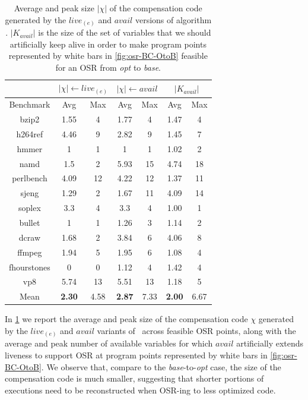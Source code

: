\begin{table}[!ht]
\begin{center}
\begin{small}
\begin{tabular}{ |c|c|c|c|c|c|c| }
\cline{2-7}
\multicolumn{1}{l|}{} & \multicolumn{2}{c|}{$|\chi|\leftarrow live_{(e)}$} & \multicolumn{2}{c|}{$|\chi|\leftarrow avail$} & \multicolumn{2}{c|}{$|K_{avail}|$} \\
\hline
Benchmark & Avg & Max & Avg & Max & Avg & Max \\
\hline
\hline
bzip2 & 1.55 & 4 & 1.77 & 4 & 1.47 & 4 \\
\hline
h264ref & 4.46 & 9 & 2.82 & 9 & 1.45 & 7 \\
\hline
hmmer & 1 & 1 & 1 & 1 & 1.02 & 2 \\
\hline
namd & 1.5 & 2 & 5.93 & 15 & 4.74 & 18\\
\hline
perlbench & 4.09 & 12 & 4.22 & 12 & 1.37 & 11 \\
\hline
sjeng & 1.29 & 2 & 1.67 & 11 & 4.09 & 14 \\
\hline
soplex & 3.3 & 4 & 3.3 & 4 & 1.00 & 1 \\
\hline
bullet & 1 & 1 & 1.26 & 3 & 1.14 & 2 \\
\hline
dcraw & 1.68 & 2 & 3.84 & 6 & 4.06 & 8 \\
\hline
ffmpeg & 1.94 & 5 & 1.95 & 6 & 1.08 & 4 \\
\hline
fhourstones & 0 & 0 & 1.12 & 4 & 1.42 & 4 \\
\hline
vp8 & 5.74 & 13 & 5.51 & 13 & 1.18 & 5 \\
\hline
\hline
Mean & {\bf 2.30} & 4.58 & {\bf 2.87} & 7.33 & {\bf 2.00} & 6.67 \\
\hline
\end{tabular}
\end{small}
\end{center}
\caption{\label{tab:OSR-alC-prologue-OtoB} Average and peak size $|\chi|$ of the compensation code generated by the $live_{(e)}$ and $avail$ versions of algorithm \reconstruct. $|K_{avail}|$ is the size of the set of variables that we should artificially keep alive in order to make program points represented by white bars in \myfigure\ref{fig:osr-BC-OtoB} feasible for an OSR from {\em opt} to {\em base}.}
\end{table}

In \mytable\ref{tab:OSR-alC-prologue-OtoB} we report the average and peak size of the compensation code $\chi$ generated by the $live_{(e)}$ and $avail$ variants of \reconstruct\ across feasible OSR points, along with the average and peak number of available variables for which $avail$ artificially extends liveness to support OSR at program points represented by white bars in \myfigure\ref{fig:osr-BC-OtoB}. We observe that, compare to the {\em base}-to-{\em opt} case, the size of the compensation code is much smaller, suggesting that shorter portions of executions need to be reconstructed when OSR-ing to less optimized code.

